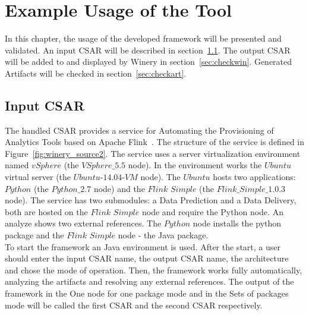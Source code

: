 
\chapter{Example Usage of the Tool}\label{chap:check}
In this chapter, the usage of the developed framework will be presented and validated.
An input CSAR will be described in section~\ref{sec:inputcsar}.
The output CSAR will be added to and displayed by Winery in section~\ref{sec:checkwin}.
Generated Artifacts will be checked in section~\ref{sec:checkart}.

\section{Input CSAR}\label{sec:inputcsar}
The handled CSAR provides a service for Automating the Provisioning of Analytics Tools based on Apache Flink~\cite{csar_test}.
The structure of the service is defined in Figure~\ref{fig:winery_source2}. 
The service uses a server virtualization environment named $vSphere$ (the $VSphere\_5.5$ node). 
In the environment works the $Ubuntu$ virtual server (the $Ubuntu$-$14.04$-$VM$ node).
The $Ubuntu$ hosts two applications: $Python$ (the $Python\_2.7$ node) and the $Flink$ $Simple$ (the $Flink\_Simple\_1.0.3$ node).
The service has two submodules: a Data Prediction and a Data Delivery, both are hosted on the $Flink$ $Simple$ node and require the Python node. 
An analyze shows two external references. The $Python$ node installs the python package and the $Flink$ $Simple$ node - the Java package. \\

To start the framework an Java environment is used.
After the start, a user should enter the input CSAR name, the output CSAR name, the architecture and chose the mode of operation.
Then, the framework works fully automatically, analyzing the artifacts and resolving any external references.
The output of the framework in the One node for one package mode and in the Sets of packages mode will be called the first CSAR and the second CSAR respectively.

